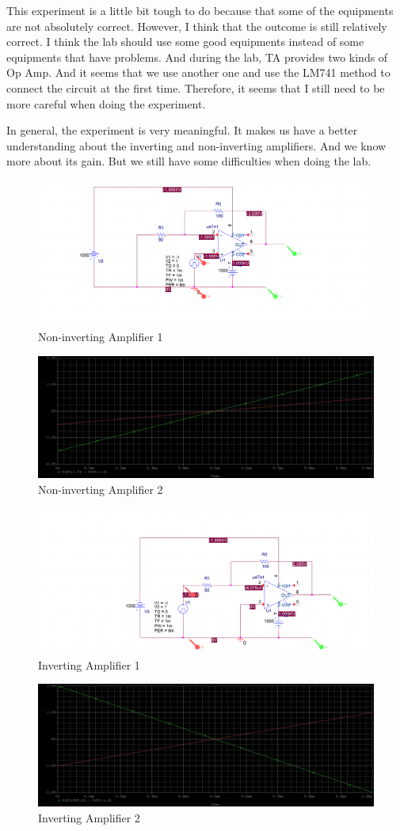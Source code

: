 \documentclass{article}
\begin{document}
This experiment is a little bit tough to do because that some of the equipments are not absolutely correct. However, I think that the outcome is still relatively correct. I think the lab should use some good equipments instead of some equipments that have problems. And during the lab, TA provides two kinds of Op Amp. And it seems that we use another one and use the LM741 method to connect the circuit at the first time. Therefore, it seems that I still need to be more careful when doing the experiment.


In general, the experiment is very meaningful. It makes us have a better understanding about the inverting and non-inverting amplifiers. And we know more about its gain. But we still have some difficulties when doing the lab.
\begin{figure}[H]
	\centering
	\includegraphics[width=0.7\linewidth]{bonus11}
	\caption{Non-inverting Amplifier 1}
	\label{fig:bonus11}
\end{figure}
\begin{figure}[H]
	\centering
	\includegraphics[width=0.7\linewidth]{bonus12}
	\caption{Non-inverting Amplifier 2}
	\label{fig:bonus12}
\end{figure}
\begin{figure}[H]
	\centering
	\includegraphics[width=0.7\linewidth]{bonus21}
	\caption{Inverting Amplifier 1}
	\label{fig:bonus21}
\end{figure}
\begin{figure}[H]
	\centering
	\includegraphics[width=0.7\linewidth]{bonus22}
	\caption{Inverting Amplifier 2}
	\label{fig:bonus22}
\end{figure}
\end{document}
